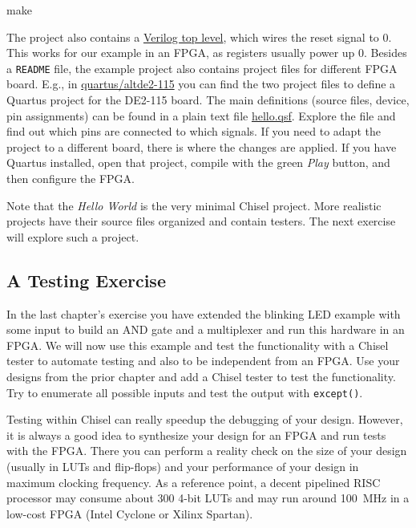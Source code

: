 \documentclass[%
    10pt, %
    headinclude, footexclude,
    openright, %
    notitlepage,
    cleardoubleempty,
    headsepline,
    pointlessnumbers,
    bibtotoc, idxtotoc,
    ]{scrbook}
\newcommand{\code}[1]{{\small{\texttt{#1}}}}
\newcommand{\myref}[2]{\href{#1}{#2}}
\begin{document}
\begin{chisel}
make
\end{chisel}

The project also contains a
\myref{https://github.com/schoeberl/chisel-examples/blob/master/hello-world/verilog/hello_top.v}{Verilog top level},
which wires the reset signal to 0.
This works for our example in an FPGA, as registers usually power up 0.
Besides a \code{README} file, the example project also contains project
files for different FPGA board. E.g., in
\myref{https://github.com/schoeberl/chisel-examples/tree/master/hello-world/quartus/altde2-115}{quartus/altde2-115} 
you can find the two project files to define a Quartus project for the DE2-115 board.
The main definitions (source files, device, pin assignments) can be found in a plain text file
\myref{https://github.com/schoeberl/chisel-examples/blob/master/hello-world/quartus/altde2-115/hello.qsf}{hello.qsf}.
Explore the file and find out which pins are connected to which signals.
If you need to adapt the project to a different board, there is where the changes are applied.
If you have Quartus installed, open that project, compile with the green \emph{Play} button,
and then configure the FPGA.

Note that the \emph{Hello World} is the very minimal Chisel project.
More realistic projects have their source files organized and contain testers.
The next exercise will explore such a project.

\subsection{A Testing Exercise}

In the last chapter's exercise you have extended the blinking LED example with some input
to build an AND gate and a multiplexer and run this hardware in an FPGA.
We will now use this example and test the functionality with a Chisel tester
to automate testing and also to be independent from an FPGA.
Use your designs from the prior chapter and add a Chisel tester to test the functionality.
Try to enumerate all possible inputs and test the output with \code{except()}.

Testing within Chisel can really speedup the debugging of your design.
However, it is always a good idea to synthesize your design for an FPGA and run tests
with the FPGA. There you can perform a reality check on the size of your design (usually
in LUTs and flip-flops) and your performance of your design in maximum clocking frequency.
As a reference point, a decent pipelined RISC processor may consume about 300
4-bit LUTs and may run around 100~MHz in a low-cost FPGA (Intel Cyclone or
Xilinx Spartan).
\end{document}
